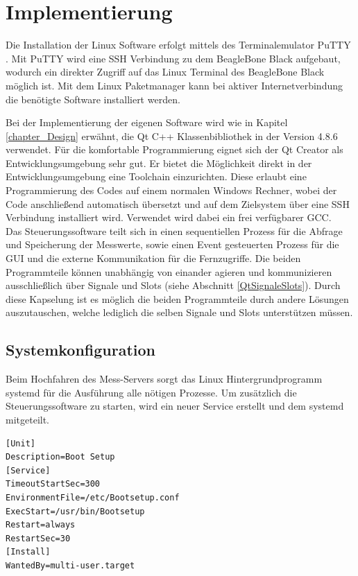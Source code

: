 \chapter{Implementierung}
\label{chapter_Implementierung}



Die Installation der Linux Software erfolgt mittels des Terminalemulator PuTTY \cite{putty}. Mit \mbox{PuTTY} wird eine \ac{SSH} Verbindung zu dem BeagleBone Black aufgebaut, wodurch ein direkter Zugriff auf das Linux Terminal des BeagleBone Black möglich ist. Mit dem Linux Paketmanager kann bei aktiver Internetverbindung die benötigte Software installiert werden.\ 

Bei der Implementierung der eigenen Software wird wie in Kapitel \ref{chapter_Design} erwähnt, die Qt C++ Klassenbibliothek in der Version 4.8.6 verwendet. Für die komfortable Programmierung eignet sich der Qt Creator als Entwicklungsumgebung sehr gut. Er bietet die Möglichkeit direkt in der Entwicklungsumgebung eine Toolchain einzurichten. Diese erlaubt eine Programmierung des Codes auf einem normalen Windows Rechner, wobei der Code anschließend automatisch übersetzt und auf dem Zielsystem über eine \ac{SSH} Verbindung installiert wird. Verwendet wird dabei ein frei verfügbarer \ac{GCC}.\\
Das Steuerungssoftware teilt sich in einen sequentiellen Prozess für die Abfrage und Speicherung der Messwerte, sowie einen Event gesteuerten Prozess für die \ac{GUI} und die externe Kommunikation für die Fernzugriffe. 
Die beiden Programmteile können unabhängig von einander agieren und kommunizieren ausschließlich über Signale und Slots (siehe Abschnitt \ref{QtSignaleSlots}). Durch diese Kapselung ist es möglich die beiden Programmteile durch andere Lösungen auszutauschen, welche lediglich die selben Signale und Slots unterstützen müssen.

\section{Systemkonfiguration}

Beim Hochfahren des Mess-Servers sorgt das Linux Hintergrundprogramm systemd für die Ausführung alle nötigen Prozesse. Um zusätzlich die Steuerungssoftware zu starten, wird ein neuer Service erstellt und dem systemd mitgeteilt.\\

\begin{lstlisting}[caption={Systemd Service},label=lst_SystemdService]
[Unit]
Description=Boot Setup
[Service]
TimeoutStartSec=300
EnvironmentFile=/etc/Bootsetup.conf
ExecStart=/usr/bin/Bootsetup
Restart=always
RestartSec=30
[Install]
WantedBy=multi-user.target
\end{lstlisting}


